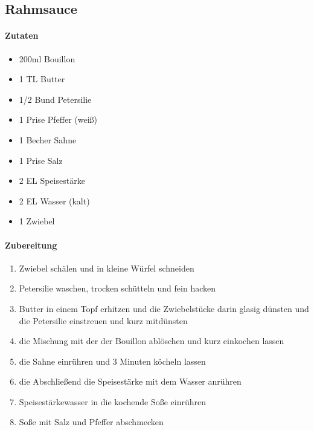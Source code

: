 \newpage
\subsection{Rahmsauce}
\paragraph{Zutaten}
\begin{itemize}[noitemsep]
	\item 200ml Bouillon 
	\item 1 TL Butter
	\item 1/2 Bund Petersilie
	\item 1 Prise Pfeffer (weiß)
	\item 1 Becher Sahne
	\item 1 Prise Salz
	\item 2 EL Speisestärke
	\item 2 EL Wasser (kalt)
	\item 1 Zwiebel
\end{itemize}
\paragraph{Zubereitung}
\begin{enumerate}[noitemsep]
	\item Zwiebel schälen und in kleine Würfel schneiden
	\item Petersilie waschen, trocken schütteln und fein hacken
	\item Butter in einem Topf erhitzen und die Zwiebelstücke darin glasig dünsten und die Petersilie einstreuen und kurz mitdünsten
	\item die Mischung mit der der Bouillon ablöschen und kurz einkochen lassen
	\item die Sahne einrühren und 3 Minuten köcheln lassen
	\item die Abschließend die Speisestärke mit dem Wasser anrühren
	\item Speisestärkewasser in die kochende Soße einrühren 
	\item Soße mit Salz und Pfeffer abschmecken
\end{enumerate}
